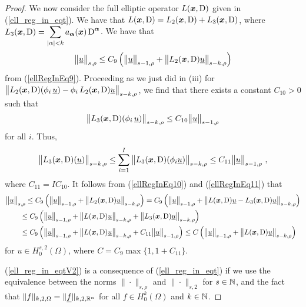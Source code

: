\begin{proof}
 We now consider the full elliptic operator
$L({\bm{x}},\operatorname{D})$ given in (\ref{ell_reg_in_eqt}).  We have that
$L({\bm{x}},\operatorname{D}) = L_2({\bm{x}},\operatorname{D}) + L_3({\bm{x}},\operatorname{D})$, where
$\displaystyle L_3({\bm{x}},\operatorname{D})
= \sum_{|\alpha|< k} a_{{\bm{\alpha}}}({\bm{x}}) \operatorname{D}^{{\bm{\alpha}}}$.
We have that
\begin{equation} \label{ellRegInEq10}
\big\|\underline{u}\big\|_{s,\rho} \leq C_9
\left( \big\|\underline{u}\big\|_{s-1,\rho} +
\big\|L_2({\bm{x}},\operatorname{D})\underline{u}\big\|_{s-k,\rho} \right)
\end{equation}
from (\ref{ellRegInEq9}).  Proceeding as we just did in (iii) for
$\displaystyle \big\|L_2({\bm{x}},\operatorname{D})(\phi_i\,\underline{u})
- \phi_i\, L_2({\bm{x}},\operatorname{D})\underline{u} \big\|_{s-k,\rho}$, we find
that there exists a constant $C_{10}>0$ such that
\[
 \big\| L_3({\bm{x}},\operatorname{D})(\phi_i\,\underline{u}) \big\|_{s-k,\rho}
\leq C_{10} \big\|\underline{u}\big\|_{s-1,\rho}
\]
for all $i$.  Thus,
\begin{equation} \label{ellRegInEq11}
\big\| L_3(\VEC{x},\diff)(\underline{u}) \big\|_{s-k,\rho}
\leq \sum_{i=1}^I \big\| L_3(\VEC{x},\diff)(\phi_i \underline{u})
\big\|_{s-k,\rho} \leq C_{11} \big\|\underline{u}\big\|_{s-1,\rho} \ ,
\end{equation}
where $C_{11} = I C_{10}$.  It follows from (\ref{ellRegInEq10}) and
(\ref{ellRegInEq11}) that
\begin{align*}
&\big\|\underline{u}\big\|_{s,\rho}
\leq C_9 \left( \big\|\underline{u}\big\|_{s-1,\rho} +
\big\|L_2({\bm{x}},\operatorname{D})\underline{u}\big\|_{s-k,\rho} \right)
= C_9 \left( \big\|\underline{u}\big\|_{s-1,\rho} +
\big\|L({\bm{x}},\operatorname{D})\underline{u}
- L_3({\bm{x}},\operatorname{D})\underline{u}\big\|_{s-k,\rho} \right) \\
&\qquad \leq C_9 \left( \big\|\underline{u}\big\|_{s-1,\rho} +
\big\|L({\bm{x}},\operatorname{D})\underline{u}\big\|_{s-k,\rho} +
\big\|L_3({\bm{x}},\operatorname{D})\underline{u}\big\|_{s-k,\rho} \right) \\
&\qquad \leq C_9 \left( \big\|\underline{u}\big\|_{s-1,\rho} +
\big\|L({\bm{x}},\operatorname{D})\underline{u}\big\|_{s-k,\rho} +
C_{11} \big\|\underline{u}\big\|_{s-1,\rho} \right)
\leq C \left( \big\|\underline{u}\big\|_{s-1,\rho} +
\big\|L({\bm{x}},\operatorname{D})\underline{u}\big\|_{s-k,\rho} \right)
\end{align*}
for $u \in H^{s,2}_0(\Omega)$, where $C = C_9 \max\{1, 1+C_{11}\}$.

 (\ref{ell_reg_in_eqtV2}) is a consequence of
(\ref{ell_reg_in_eqt}) if we use the equivalence between the norms
$\|\cdot\|_{s,\rho}$ and $\|\cdot\|_{s,2}$ for $s\in \mathbb{N}$, and the
fact that $\|f\|_{k,2,\Omega} = \|\underline{f}\|_{k,2,\mathbb{R}^n}$ for all
$\displaystyle f \in H^k_0(\Omega)$ and $k \in \mathbb{N}$.
\end{proof}

